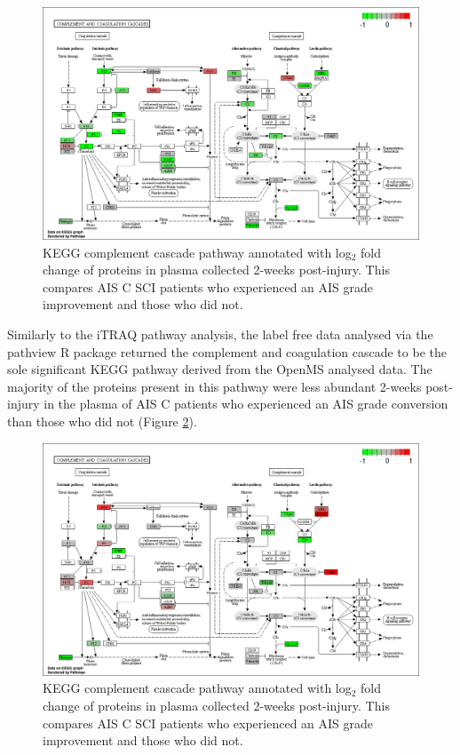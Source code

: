 \documentclass[9pt,lineno]{elife}
\begin{document}
\begin{figure}

{\centering \includegraphics[width=18.31in]{figures/kegg_pathways/hsa04610_pathview} 

}

\caption{KEGG complement cascade pathway annotated with log\(_2\) fold change of proteins in plasma collected 2-weeks post-injury. This compares AIS C SCI patients who experienced an AIS grade improvement and those who did not.}\label{fig:kegg-complement}
\end{figure}

Similarly to the iTRAQ pathway analysis, the label free data analysed via the pathview R package returned the complement and coagulation cascade to be the sole significant KEGG pathway derived from the OpenMS analysed data.
The majority of the proteins present in this pathway were less abundant 2-weeks post-injury in the plasma of AIS C patients who experienced an AIS grade conversion than those who did not (Figure \ref{fig:kegg-complement-chap4}).



\begin{figure}

{\centering \includegraphics[width=18.31in]{figures/kegg_pathways/hsa04610.pathview_label-free} 

}

\caption{KEGG complement cascade pathway annotated with log\(_2\) fold change of proteins in plasma collected 2-weeks post-injury. This compares AIS C SCI patients who experienced an AIS grade improvement and those who did not.}\label{fig:kegg-complement-chap4}
\end{figure}
\end{document}
